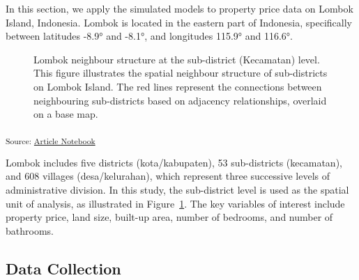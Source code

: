 \documentclass[
  default,
]{sn-jnl}
\begin{document}
In this section, we apply the simulated models to property price data on
Lombok Island, Indonesia. Lombok is located in the eastern part of
Indonesia, specifically between latitudes -8.9° and -8.1°, and
longitudes 115.9° and 116.6°.

\label{cell-fig-lombokmap}
\begin{figure}[H]


\caption{\label{fig-lombokmap}Lombok neighbour structure at the
sub-district (Kecamatan) level. This figure illustrates the spatial
neighbour structure of sub-districts on Lombok Island. The red lines
represent the connections between neighbouring sub-districts based on
adjacency relationships, overlaid on a base map.}

\end{figure}%

\textsubscript{Source:
\href{https://indiraputeri-phd.github.io/CAR_simcomp/manuscript.qmd.html}{Article
Notebook}}

Lombok includes five districts (kota/kabupaten), 53 sub-districts
(kecamatan), and 608 villages (desa/kelurahan), which represent three
successive levels of administrative division. In this study, the
sub-district level is used as the spatial unit of analysis, as
illustrated in Figure~\ref{fig-lombokmap}. The key variables of interest
include property price, land size, built-up area, number of bedrooms,
and number of bathrooms.

\subsection{Data Collection}\label{data-collection}
\end{document}
